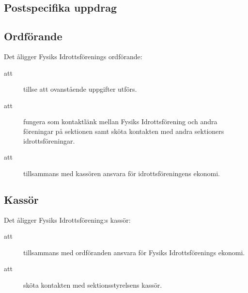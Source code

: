 \documentclass[a4paper]{article}
\begin{document}
\begin{foreningenv}{\forening{}}
    \section{Postspecifika uppdrag}
    \subsection{Ordförande}
    Det åligger Fysiks Idrottsförenings ordförande:
    \begin{description}
        \item[att] tillse att ovanstående uppgifter utförs.
        \item[att] fungera som kontaktlänk mellan Fysiks Idrottsförening och andra föreningar på sektionen samt sköta kontakten med andra sektioners idrottsföreningar.
        \item[att] tillsammans med kassören ansvara för idrottsföreningens ekonomi.
    \end{description}
    
    \subsection{Kassör}
    Det åligger Fysiks Idrottsförening:s kassör:
    \begin{description}
        \item[att] tillsammans med ordföranden ansvara för Fysiks Idrottsförenings ekonomi.
        \item[att] sköta kontakten med sektionsstyrelsens kassör.
    \end{description}
\end{foreningenv}
\end{document}
